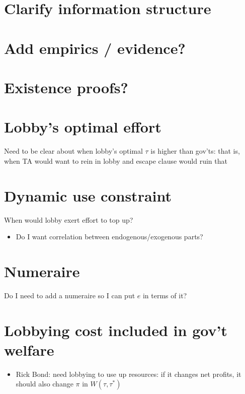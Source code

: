 \documentclass[12pt]{article}
\begin{document}
\section{Clarify information structure}

\section{Add empirics / evidence?}

\section{Existence proofs?}

\section{Lobby's optimal effort}
Need to be clear about when lobby's optimal $\tau$ is higher than gov'ts: that is, when TA would want to rein in lobby and escape clause would ruin that

\section{Dynamic use constraint}
When would lobby exert effort to top up?
\begin{itemize}
	\item Do I want correlation between endogenous/exogenous parts? 
\end{itemize}

\section{Numeraire}
Do I need to add a numeraire so I can put $e$ in terms of it?

\section{Lobbying cost included in gov't welfare}
	\begin{itemize}
		\item Rick Bond: need lobbying to use up resources: if it changes net profits, it should also change $\pi$ in $W(\tau,\tau^*)$
	\end{itemize}
\end{document}
